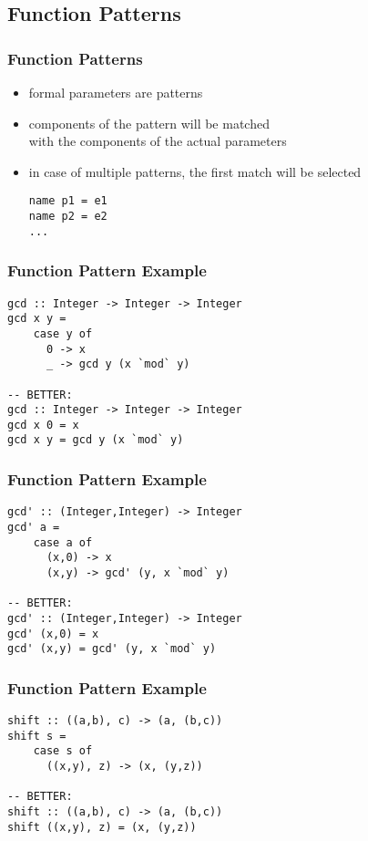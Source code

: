 \documentclass[dvipsnames]{beamer}
\theoremstyle{plain}
\begin{document}
\subsection{Function Patterns}

\begin{frame}[fragile]
  \frametitle{Function Patterns}

  \begin{itemize}
    \item formal parameters are patterns
    \item components of the pattern will be matched\\
      with the components of the actual parameters

    \medskip
    \item in case of multiple patterns, the first match will be selected
    \smallskip
    \begin{lstlisting}
name p1 = e1
name p2 = e2
...
    \end{lstlisting}
  \end{itemize}
\end{frame}

\begin{frame}[fragile]
  \frametitle{Function Pattern Example}

  \begin{lstlisting}
gcd :: Integer -> Integer -> Integer
gcd x y =
    case y of
      0 -> x
      _ -> gcd y (x `mod` y)

-- BETTER:
gcd :: Integer -> Integer -> Integer
gcd x 0 = x
gcd x y = gcd y (x `mod` y)
  \end{lstlisting}
\end{frame}

\begin{frame}[fragile]
  \frametitle{Function Pattern Example}

  \begin{lstlisting}
gcd' :: (Integer,Integer) -> Integer
gcd' a =
    case a of
      (x,0) -> x
      (x,y) -> gcd' (y, x `mod` y)

-- BETTER:
gcd' :: (Integer,Integer) -> Integer
gcd' (x,0) = x
gcd' (x,y) = gcd' (y, x `mod` y)
  \end{lstlisting}
\end{frame}

\begin{frame}[fragile]
  \frametitle{Function Pattern Example}

  \begin{lstlisting}
shift :: ((a,b), c) -> (a, (b,c))
shift s =
    case s of
      ((x,y), z) -> (x, (y,z))

-- BETTER:
shift :: ((a,b), c) -> (a, (b,c))
shift ((x,y), z) = (x, (y,z))
  \end{lstlisting}
\end{frame}
\end{document}
